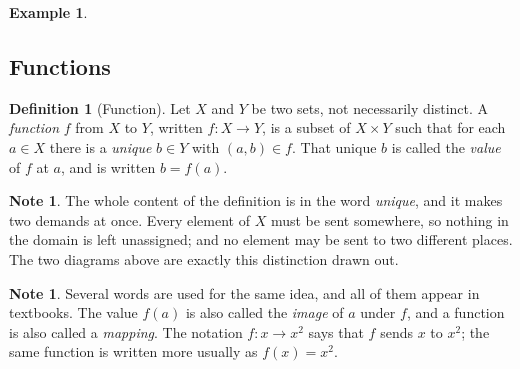 \documentclass[11pt,a4paper]{article}
\theoremstyle{definition}
\newtheorem{definition}[thm]{Definition}
\newtheorem{example}[thm]{Example}
\newtheorem{note}[thm]{Note}
\begin{document}
\begin{example}
\begin{figure}[H]
\centering
{}
\end{figure}
\vspace{1cm}
\end{example}
\subsection{Functions}
\begin{definition}[Function]
Let $X$ and $Y$ be two sets, not necessarily distinct. A \emph{function} $f$
from $X$ to $Y$, written $f:X\longrightarrow Y$, is a subset of $X\times Y$
such that for each $a\in X$ there is a \emph{unique} $b\in Y$ with
$(a,b)\in f$. That unique $b$ is called the \emph{value} of $f$ at $a$, and is
written $b=f(a)$.
\end{definition}

\begin{note}
The whole content of the definition is in the word \emph{unique}, and it makes
two demands at once. Every element of $X$ must be sent somewhere, so nothing in
the domain is left unassigned; and no element may be sent to two different
places. The two diagrams above are exactly this distinction drawn out.
\end{note}

\begin{note}
Several words are used for the same idea, and all of them appear in textbooks.
The value $f(a)$ is also called the \emph{image} of $a$ under $f$, and a
function is also called a \emph{mapping}. The notation
$f:x\longrightarrow x^{2}$ says that $f$ sends $x$ to $x^{2}$; the same
function is written more usually as $f(x)=x^{2}$.
\end{note}
\end{document}
